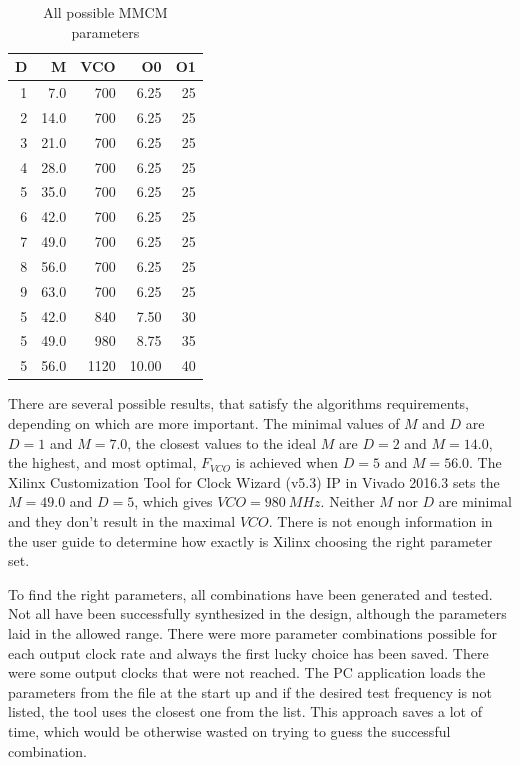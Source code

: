 \begin{table}[h]
\begin{tabular}{@{}rrrrr@{}}
\toprule
D & M & VCO & O0 & O1 \\
\midrule
1 & 7.0 & 700 & 6.25 & 25 \\ 
2 & 14.0 & 700 & 6.25 & 25 \\ 
3 & 21.0 & 700 & 6.25 & 25 \\ 
4 & 28.0 & 700 & 6.25 & 25 \\ 
5 & 35.0 & 700 & 6.25 & 25 \\  
6 & 42.0 & 700 & 6.25 & 25 \\ 
7 & 49.0 & 700 & 6.25 & 25 \\ 
8 & 56.0 & 700 & 6.25 & 25 \\ 
9 & 63.0 & 700 & 6.25 & 25 \\ 
5 & 42.0 & 840 & 7.50 & 30 \\ 
5 & 49.0 & 980 & 8.75 & 35 \\ 
5 & 56.0 & 1120 & 10.00 & 40 \\ 
\bottomrule
\end{tabular}
\centering
\caption{All possible MMCM parameters} \label{tab:MMCM}
\end{table}

There are several possible results, that satisfy the algorithms requirements, depending on which are more important. The minimal values of $M$ and $D$ are $D=1$ and $M=7.0$, the closest values to the ideal $M$ are $D=2$ and $M=14.0$, the highest, and most optimal, $F_{VCO}$ is achieved when $D=5$ and $M=56.0$. The Xilinx Customization Tool for Clock Wizard (v5.3) IP in Vivado 2016.3 sets the $M = 49.0$ and $D=5$, which gives $VCO = 980\ MHz$. Neither $M$ nor $D$ are minimal and they don't result in the maximal $VCO$. There is not enough information in the user guide to determine how exactly is Xilinx choosing the right parameter set.

To find the right parameters, all combinations have been generated and tested. Not all have been successfully synthesized in the design, although the parameters laid in the allowed range. There were more parameter combinations possible for each output clock rate and always the first lucky choice has been saved. There were some output clocks that were not reached. The PC application loads the parameters from the file at the start up and if the desired test frequency is not listed, the tool uses the closest one from the list. This approach saves a lot of time, which would be otherwise wasted on trying to guess the successful combination.

